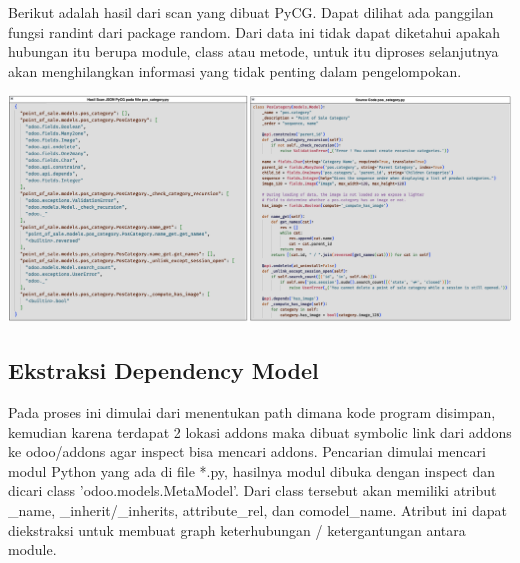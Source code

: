 Berikut adalah hasil dari scan yang dibuat PyCG. Dapat dilihat ada panggilan fungsi randint dari package random. Dari data ini tidak dapat diketahui apakah hubungan itu berupa module, class atau metode, untuk itu diproses selanjutnya akan menghilangkan informasi yang tidak penting dalam pengelompokan.

\begin{center}
	\includegraphics[width=14cm]{img/bab_4/hasil_scan_pycg.png}
	\label{fig:hasil_scan_pycg}
\end{center}

\subsection{Ekstraksi Dependency Model}
Pada proses ini dimulai dari menentukan path dimana kode program disimpan, kemudian karena terdapat 2 lokasi addons maka dibuat symbolic link dari addons ke odoo/addons agar inspect bisa mencari addons. Pencarian dimulai mencari modul Python yang ada di file *.py, hasilnya modul dibuka dengan inspect dan dicari class 'odoo.models.MetaModel'. Dari class tersebut akan memiliki atribut {\_}name, {\_}inherit/{\_}inherits, attribute{\_}rel, dan comodel{\_}name. Atribut ini dapat diekstraksi untuk membuat graph keterhubungan / ketergantungan antara module.

